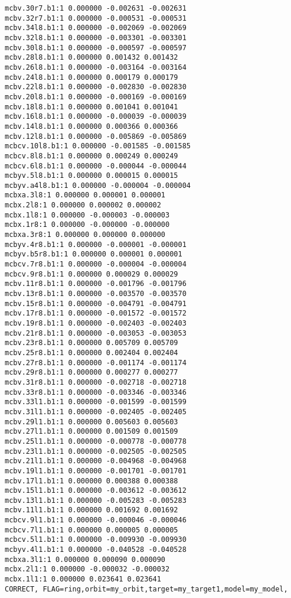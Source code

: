 \begin{verbatim}
mcbv.30r7.b1:1 0.000000 -0.002631 -0.002631
mcbv.32r7.b1:1 0.000000 -0.000531 -0.000531
mcbv.34l8.b1:1 0.000000 -0.002069 -0.002069
mcbv.32l8.b1:1 0.000000 -0.003301 -0.003301
mcbv.30l8.b1:1 0.000000 -0.000597 -0.000597
mcbv.28l8.b1:1 0.000000 0.001432 0.001432
mcbv.26l8.b1:1 0.000000 -0.003164 -0.003164
mcbv.24l8.b1:1 0.000000 0.000179 0.000179
mcbv.22l8.b1:1 0.000000 -0.002830 -0.002830
mcbv.20l8.b1:1 0.000000 -0.000169 -0.000169
mcbv.18l8.b1:1 0.000000 0.001041 0.001041
mcbv.16l8.b1:1 0.000000 -0.000039 -0.000039
mcbv.14l8.b1:1 0.000000 0.000366 0.000366
mcbv.12l8.b1:1 0.000000 -0.005869 -0.005869
mcbcv.10l8.b1:1 0.000000 -0.001585 -0.001585
mcbcv.8l8.b1:1 0.000000 0.000249 0.000249
mcbcv.6l8.b1:1 0.000000 -0.000044 -0.000044
mcbyv.5l8.b1:1 0.000000 0.000015 0.000015
mcbyv.a4l8.b1:1 0.000000 -0.000004 -0.000004
mcbxa.3l8:1 0.000000 0.000001 0.000001
mcbx.2l8:1 0.000000 0.000002 0.000002
mcbx.1l8:1 0.000000 -0.000003 -0.000003
mcbx.1r8:1 0.000000 -0.000000 -0.000000
mcbxa.3r8:1 0.000000 0.000000 0.000000
mcbyv.4r8.b1:1 0.000000 -0.000001 -0.000001
mcbyv.b5r8.b1:1 0.000000 0.000001 0.000001
mcbcv.7r8.b1:1 0.000000 -0.000004 -0.000004
mcbcv.9r8.b1:1 0.000000 0.000029 0.000029
mcbv.11r8.b1:1 0.000000 -0.001796 -0.001796
mcbv.13r8.b1:1 0.000000 -0.003570 -0.003570
mcbv.15r8.b1:1 0.000000 -0.004791 -0.004791
mcbv.17r8.b1:1 0.000000 -0.001572 -0.001572
mcbv.19r8.b1:1 0.000000 -0.002403 -0.002403
mcbv.21r8.b1:1 0.000000 -0.003053 -0.003053
mcbv.23r8.b1:1 0.000000 0.005709 0.005709
mcbv.25r8.b1:1 0.000000 0.002404 0.002404
mcbv.27r8.b1:1 0.000000 -0.001174 -0.001174
mcbv.29r8.b1:1 0.000000 0.000277 0.000277
mcbv.31r8.b1:1 0.000000 -0.002718 -0.002718
mcbv.33r8.b1:1 0.000000 -0.003346 -0.003346
mcbv.33l1.b1:1 0.000000 -0.001599 -0.001599
mcbv.31l1.b1:1 0.000000 -0.002405 -0.002405
mcbv.29l1.b1:1 0.000000 0.005603 0.005603
mcbv.27l1.b1:1 0.000000 0.001509 0.001509
mcbv.25l1.b1:1 0.000000 -0.000778 -0.000778
mcbv.23l1.b1:1 0.000000 -0.002505 -0.002505
mcbv.21l1.b1:1 0.000000 -0.004968 -0.004968
mcbv.19l1.b1:1 0.000000 -0.001701 -0.001701
mcbv.17l1.b1:1 0.000000 0.000388 0.000388
mcbv.15l1.b1:1 0.000000 -0.003612 -0.003612
mcbv.13l1.b1:1 0.000000 -0.005283 -0.005283
mcbv.11l1.b1:1 0.000000 0.001692 0.001692
mcbcv.9l1.b1:1 0.000000 -0.000046 -0.000046
mcbcv.7l1.b1:1 0.000000 0.000005 0.000005
mcbcv.5l1.b1:1 0.000000 -0.009930 -0.009930
mcbyv.4l1.b1:1 0.000000 -0.040528 -0.040528
mcbxa.3l1:1 0.000000 0.000090 0.000090
mcbx.2l1:1 0.000000 -0.000032 -0.000032
mcbx.1l1:1 0.000000 0.023641 0.023641
CORRECT, FLAG=ring,orbit=my_orbit,target=my_target1,model=my_model,


\end{verbatim}
